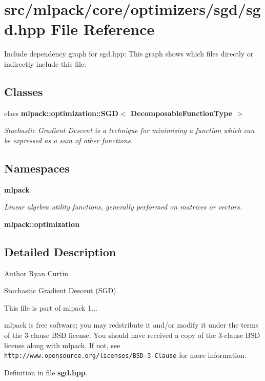 \section{src/mlpack/core/optimizers/sgd/sgd.hpp File Reference}
\label{sgd_8hpp}
Include dependency graph for sgd.\-hpp\-:
This graph shows which files directly or indirectly include this file\-:
\subsection*{Classes}
\begin{DoxyCompactItemize}
\item 
class {\bf mlpack\-::optimization\-::\-S\-G\-D$<$ Decomposable\-Function\-Type $>$}
\begin{DoxyCompactList}\small\item\em Stochastic Gradient Descent is a technique for minimizing a function which can be expressed as a sum of other functions. \end{DoxyCompactList}\end{DoxyCompactItemize}
\subsection*{Namespaces}
\begin{DoxyCompactItemize}
\item 
{\bf mlpack}
\begin{DoxyCompactList}\small\item\em Linear algebra utility functions, generally performed on matrices or vectors. \end{DoxyCompactList}\item 
{\bf mlpack\-::optimization}
\end{DoxyCompactItemize}


\subsection{Detailed Description}
\begin{DoxyAuthor}{Author}
Ryan Curtin
\end{DoxyAuthor}
Stochastic Gradient Descent (S\-G\-D).

This file is part of mlpack 1...

mlpack is free software; you may redstribute it and/or modify it under the terms of the 3-\/clause B\-S\-D license. You should have received a copy of the 3-\/clause B\-S\-D license along with mlpack. If not, see {\tt http\-://www.\-opensource.\-org/licenses/\-B\-S\-D-\/3-\/\-Clause} for more information. 

Definition in file {\bf sgd.\-hpp}.

